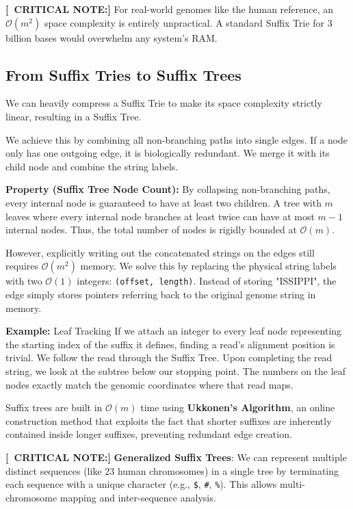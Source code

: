 \documentclass[11pt,a4paper]{article}
\newcommand{\sta}{\textbf{[\textasteriskcentered\ CRITICAL NOTE:] }}
\begin{document}
\sta For real-world genomes like the human reference, an $\mathcal{O}(m^2)$ space complexity is entirely unpractical. A standard Suffix Trie for 3 billion bases would overwhelm any system's RAM.

\subsection{From Suffix Tries to Suffix Trees}

We can heavily compress a Suffix Trie to make its space complexity strictly linear, resulting in a Suffix Tree.

We achieve this by combining all non-branching paths into single edges. If a node only has one outgoing edge, it is biologically redundant. We merge it with its child node and combine the string labels. 

\textbf{Property (Suffix Tree Node Count):}
By collapsing non-branching paths, every internal node is guaranteed to have at least two children. A tree with $m$ leaves where every internal node branches at least twice can have at most $m-1$ internal nodes. Thus, the total number of nodes is rigidly bounded at $\mathcal{O}(m)$.

However, explicitly writing out the concatenated strings on the edges still requires $\mathcal{O}(m^2)$ memory. We solve this by replacing the physical string labels with two $\mathcal{O}(1)$ integers: \texttt{(offset, length)}. Instead of storing "ISSIPPI", the edge simply stores pointers referring back to the original genome string in memory.

\textbf{Example:} Leaf Tracking
If we attach an integer to every leaf node representing the starting index of the suffix it defines, finding a read's alignment position is trivial. We follow the read through the Suffix Tree. Upon completing the read string, we look at the subtree below our stopping point. The numbers on the leaf nodes exactly match the genomic coordinates where that read maps.

Suffix trees are built in $\mathcal{O}(m)$ time using \textbf{Ukkonen's Algorithm}, an online construction method that exploits the fact that shorter suffixes are inherently contained inside longer suffixes, preventing redundant edge creation.

\sta \textbf{Generalized Suffix Trees}: We can represent multiple distinct sequences (like 23 human chromosomes) in a single tree by terminating each sequence with a unique character (e.g., \texttt{\$}, \texttt{\#}, \texttt{\%}). This allows multi-chromosome mapping and inter-sequence analysis.
\end{document}
